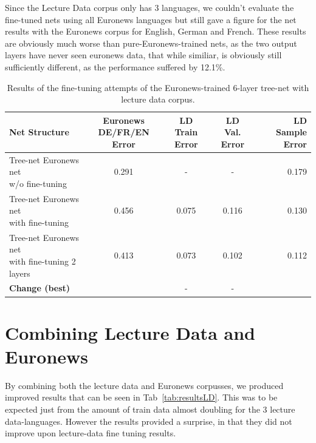Since the Lecture Data corpus only has 3 languages, we couldn't evaluate the fine-tuned nets using all Euronews languages but still gave a figure for the net results with the Euronews corpus for English, German and French. These results are obviously much worse than pure-Euronews-trained nets, as the two output layers have never seen euronews data, that while similiar, is obviously still sufficiently different, as the performance suffered by 12.1\%.


\begin{table}
\caption{Results of the fine-tuning attempts of the Euronews-trained 6-layer tree-net with lecture data corpus.}
\label{tab:LIDFine}
\begin{tabular}{| l | c | c | c | r | }
	\hline
	\textbf{Net Structure} & \parbox[t]{2.5cm}{\textbf{Euronews} \\ \textbf{DE/FR/EN Error}} &  \parbox[t]{2.5cm}{\textbf{LD} \\ \textbf{Train Error}} &  \parbox[t]{2.5cm}{\textbf{LD} \\ \textbf{Val. Error}} &  \parbox[t]{2.5cm}{\textbf{LD} \\ \textbf{Sample Error}}  \\
	\hline
	\parbox[t]{5cm}{Tree-net Euronews net \\
	 w/o fine-tuning}  & 0.291 & - & - & 0.179 \\
	\hline
	\parbox[t]{4.2cm}{Tree-net Euronews net \\ with fine-tuning } & 0.456 & 0.075 & 0.116 & 0.130 \\
	\hdashline
	\parbox[t]{4.2cm}{Tree-net Euronews net \\ with fine-tuning 2 layers } & 0.413 & 0.073 & 0.102 & 0.112 \\
	\hline
	\textbf{Change (best)} &  & - & - &  \\
	\hline
\end{tabular}
\end{table}


\section{Combining Lecture Data and Euronews}
\label{sec:LIDNetworkConcat}
By combining both the lecture data and Euronews corpusses, we produced improved results that can be seen in Tab~\ref{tab:resultsLD}. This was to be expected just from the amount of train data almost doubling for the 3 lecture data-languages. However the results provided a surprise, in that they did not improve upon lecture-data fine tuning results. 

